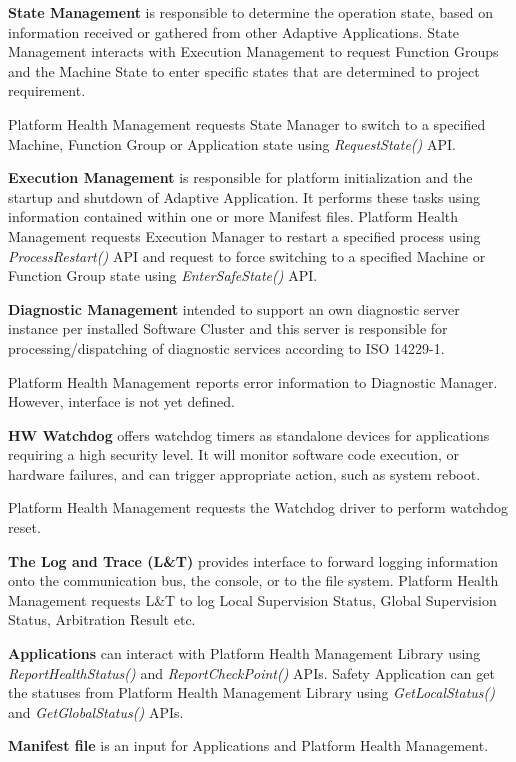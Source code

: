 \begin{DoxyItemize}
\item {\bfseries State Management} is responsible to determine the operation state, based on information received or gathered from other Adaptive Applications. State Management interacts with Execution Management to request Function Groups and the Machine State to enter specific states that are determined to project requirement.

Platform Health Management requests State Manager to switch to a specified Machine, Function Group or Application state using {\itshape Request\+State()} A\+PI.
\item {\bfseries Execution Management} is responsible for platform initialization and the startup and shutdown of Adaptive Application. It performs these tasks using information contained within one or more Manifest files. Platform Health Management requests Execution Manager to restart a specified process using {\itshape Process\+Restart()} A\+PI and request to force switching to a specified Machine or Function Group state using {\itshape Enter\+Safe\+State()} A\+PI.
\item {\bfseries Diagnostic Management} intended to support an own diagnostic server instance per installed Software Cluster and this server is responsible for processing/dispatching of diagnostic services according to I\+SO 14229-\/1.

Platform Health Management reports error information to Diagnostic Manager. However, interface is not yet defined.
\item {\bfseries HW Watchdog} offers watchdog timers as standalone devices for applications requiring a high security level. It will monitor software code execution, or hardware failures, and can trigger appropriate action, such as system reboot.

Platform Health Management requests the Watchdog driver to perform watchdog reset.
\item {\bfseries The Log and Trace (L\&T)} provides interface to forward logging information onto the communication bus, the console, or to the file system. Platform Health Management requests L\&T to log Local Supervision Status, Global Supervision Status, Arbitration Result etc.
\item {\bfseries Applications} can interact with Platform Health Management Library using {\itshape Report\+Health\+Status()} and {\itshape Report\+Check\+Point()} A\+P\+Is. Safety Application can get the statuses from Platform Health Management Library using {\itshape Get\+Local\+Status()} and {\itshape Get\+Global\+Status()} A\+P\+Is.
\item {\bfseries Manifest file} is an input for Applications and Platform Health Management.
\end{DoxyItemize}

